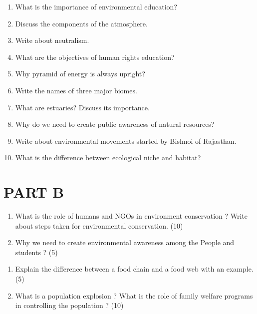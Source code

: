 \documentclass[12pt,a4paper]{article}
\begin{document}
\begin{questions}
    \item \begin{enumerate}[label=(\alph*), leftmargin=2em]
        \item What is the importance of environmental education?
        \item Discuss the components of the atmosphere.
        \item Write about neutralism.
        \item What are the objectives of human rights education?
        \item Why pyramid of energy is always upright?
        \item Write the names of three major biomes.
        \item What are estuaries? Discuss its importance.
        \item Why do we need to create public awareness of natural resources?
        \item Write about environmental movements started by Bishnoi of Rajasthan.
        \item What is the difference between ecological niche and habitat?
    \end{enumerate}

\vspace{1em}

\section*{\textbf{PART B}}

    \item \begin{enumerate}[label=(\alph*), leftmargin=2em]
        \item What is the role of humans and NGOs in environment conservation ? Write about steps taken for environmental conservation. \hfill (10)
        \item Why we need to create environmental awareness among the People and students ? \hfill (5)
    \end{enumerate}

    \vspace{\baselineskip}
    
    \item \begin{enumerate}[label=(\alph*), leftmargin=2em]
        \item Explain the difference between a food chain and a food web with an example. \hfill (5)
        \item What is a population explosion ? What is the role of family welfare programs in controlling the population ? \hfill (10)
    \end{enumerate}


\end{questions}
\end{document}
